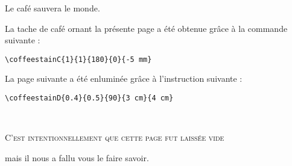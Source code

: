 \documentclass[a4paper, 11pt, BCOR = 0 pt, DIV = 13, oneside, french]{scrartcl}
\begin{document}
\noindent
Le café sauvera le monde.

\vfill{}

\begin{tcolorbox}
  La tache de café ornant la présente page a été obtenue grâce à la commande suivante :

  \verb|\coffeestainC{1}{1}{180}{0}{-5 mm}|
\end{tcolorbox}

\begin{tcolorbox}
La page suivante a été enluminée grâce à l'instruction suivante :

  \verb|\coffeestainD{0.4}{0.5}{90}{3 cm}{4 cm}|
\end{tcolorbox}

\newpage{}
\pagestyle{empty}
~\\

\label{stainD}

\vfill{}
\begin{center}
\textsc{C'est intentionnellement que cette page fut laissée vide}

mais il nous a fallu vous le faire savoir.
\end{center}

\vfill{}
\end{document}
